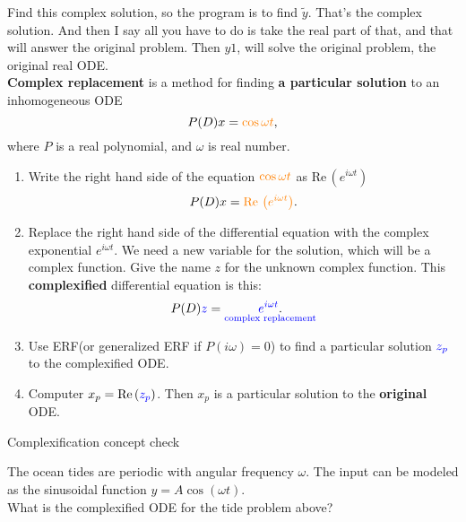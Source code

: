 Find this complex solution, so the program is to find $\tilde y$.
That's the complex solution. And then I say all you have to do is take the real part of that, and that will
answer the original problem.
Then $y1$, will solve the original problem, the original real ODE.\\

\textbf{\color{blue}Complex replacement} is a method for finding \textbf{a particular solution} to
an inhomogeneous ODE
\begin{equation*}
  P(D) x = {\color{orange}{\cos \omega t}} ,
\end{equation*}
where $P$ is a real polynomial, and $\omega$ is real number.
\begin{enumerate}
\item Write the right hand side of the equation ${\color{orange}{\cos \omega t}}$
  as $\mathrm{Re\, }\left(e^{i\omega t} \right)$
  \begin{equation*}
    P(D)x = {\color{orange}{\mathrm{Re\, }\left( e^{i\omega t}\right)}} .
  \end{equation*}
\item Replace the right hand side of the differential equation with the complex exponential
  $e^{i \omega t}$.
  We need a new variable for the solution, which will be a complex function. Give the name
  $z$ for the unknown complex function. This \textbf{\color{blue} complexified}
  differential equation is this:
  \begin{equation*}
    P(D) {\color{blue}{z}}  =
    \underset {{\color{blue}{\text {complex replacement}}} }{{\color{blue}{e^{i\omega t}}} .}
  \end{equation*}
\item Use ERF(or generalized ERF if $P(i \omega) = 0$) to find a particular solution ${\color{blue}{z_ p}}$
  to the complexified ODE.
\item Computer $x_ p = \mathrm{Re\, }({\color{blue}{z_ p}} )$. Then $x _p$ is a particular solution
  to the \textbf{original} ODE. 
\end{enumerate}

\begin{exercise}
  Complexification concept check
\end{exercise}
The ocean tides are periodic with angular frequency $\omega$.
The input can be modeled as the sinusoidal function
$y = A \cos (\omega t)$.\\
What is the complexified ODE for the tide problem above?\\

